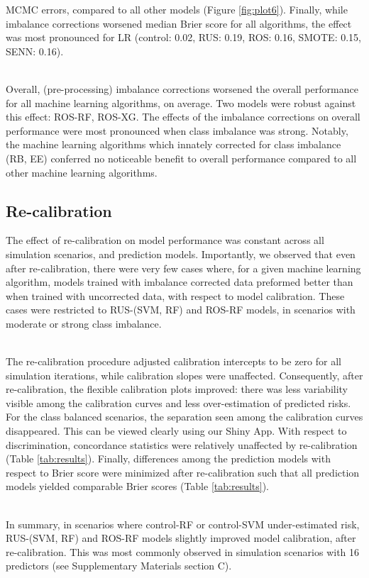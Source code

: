 \documentclass[AMA,STIX1COL,]{WileyNJD-v2}
\begin{document}
MCMC errors, compared to all other models (Figure \ref{fig:plot6}).
Finally, while imbalance corrections worsened median Brier score for all
algorithms, the effect was most pronounced for LR (control: 0.02, RUS:
0.19, ROS: 0.16, SMOTE: 0.15, SENN: 0.16).\\
\strut \\
Overall, (pre-processing) imbalance corrections worsened the overall
performance for all machine learning algorithms, on average. Two models
were robust against this effect: ROS-RF, ROS-XG. The effects of the
imbalance corrections on overall performance were most pronounced when
class imbalance was strong. Notably, the machine learning algorithms
which innately corrected for class imbalance (RB, EE) conferred no
noticeable benefit to overall performance compared to all other machine
learning algorithms.

\hypertarget{re-calibration}{%
\subsection{Re-calibration}\label{re-calibration}}

\hfill\break
The effect of re-calibration on model performance was constant across
all simulation scenarios, and prediction models. Importantly, we
observed that even after re-calibration, there were very few cases
where, for a given machine learning algorithm, models trained with
imbalance corrected data preformed better than when trained with
uncorrected data, with respect to model calibration. These cases were
restricted to RUS-(SVM, RF) and ROS-RF models, in scenarios with
moderate or strong class imbalance.\\
\strut \\
The re-calibration procedure adjusted calibration intercepts to be zero
for all simulation iterations, while calibration slopes were unaffected.
Consequently, after re-calibration, the flexible calibration plots
improved: there was less variability visible among the calibration
curves and less over-estimation of predicted risks. For the class
balanced scenarios, the separation seen among the calibration curves
disappeared. This can be viewed clearly using our Shiny App. With
respect to discrimination, concordance statistics were relatively
unaffected by re-calibration (Table \ref{tab:results}). Finally,
differences among the prediction models with respect to Brier score were
minimized after re-calibration such that all prediction models yielded
comparable Brier scores (Table \ref{tab:results}).\\
\strut \\
In summary, in scenarios where control-RF or control-SVM under-estimated
risk, RUS-(SVM, RF) and ROS-RF models slightly improved model
calibration, after re-calibration. This was most commonly observed in
simulation scenarios with 16 predictors (see Supplementary Materials
section C).
\end{document}
